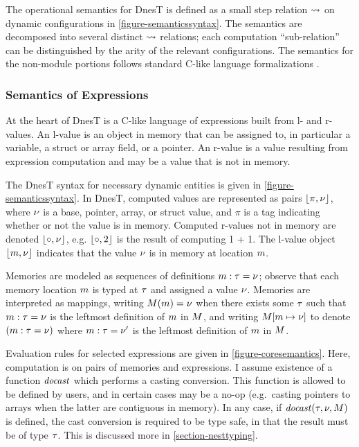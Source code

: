 The operational semantics for DnesT is defined as a small step relation $\leadsto$ on dynamic
configurations in \autoref{figure-semanticssyntax}. The semantics are decomposed into several
distinct $\leadsto$ relations; each computation ``sub-relation'' can be distinguished by the
arity of the relevant configurations. The semantics for the non-module portions follows standard
C-like language formalizations \cite{Leroy-compcert-06,grossman03}.

\semanticssyntaxfig

\subsubsection{Semantics of Expressions}

At the heart of DnesT is a C-like language of expressions built from l- and r-values. An l-value
is an object in memory that can be assigned to, in particular a variable, a struct or array
field, or a pointer. An r-value is a value resulting from expression computation and may be a
value that is not in memory.

The DnesT syntax for necessary dynamic entities is given in \autoref{figure-semanticssyntax}. In
DnesT, computed values are represented as pairs $\lfloor \pi,{\nu} \rfloor$, where ${\nu}$ is a base,
pointer, array, or struct value, and $\pi$ is a tag indicating whether or not the value is in
memory. Computed r-values not in memory are denoted $\lfloor \circ,{\nu} \rfloor$, e.g. $\lfloor \circ,2 \rfloor$
is the result of computing 1 + 1. The l-value object $\lfloor m,{\nu} \rfloor$ indicates that the value
${\nu}$ is in memory at location $m$.

Memories are modeled as sequences of definitions $m : \tau = {\nu}$; observe that each memory
location $m$ is typed at $\tau$ and assigned a value ${\nu}$. Memories are interpreted as
mappings, writing $M(m) = {\nu}$ when there exists some $\tau$ such that $m : \tau = {\nu}$
is the leftmost definition of $m$ in $M$, and writing $M[m \mapsto {\nu}]$ to
denote $(m : \tau = {\nu})$ where $m : \tau = {\nu}'$ is the leftmost definition of $m$ in
$M$.

Evaluation rules for selected expressions are given in \autoref{figure-coresemantics}. Here,
computation is on pairs of memories and expressions. I assume existence of a function
$\mathit{docast}$ which performs a casting conversion. This function is allowed to be defined by
users, and in certain cases may be a no-op (e.g.~casting pointers to arrays when the latter are
contiguous in memory). In any case, if $\mathit{docast}(\tau,{\nu},M)$ is defined, the cast
conversion is required to be type safe, in that the result must be of type $\tau$. This is
discussed more in \autoref{section-nesttyping}.

